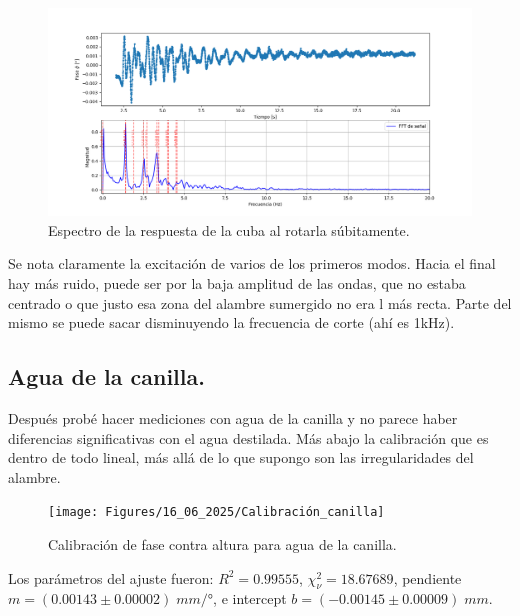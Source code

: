\begin{figure}[th!]
	\centering
	\includegraphics[width=0.87\linewidth]{Figures/16_06_2025/Rotas_caja}
	\caption{Espectro de la respuesta de la cuba al rotarla súbitamente.}
	\label{fig:rotascaja}
\end{figure}

Se nota claramente la excitación de varios de los primeros modos. Hacia el final hay más ruido, puede ser por la baja amplitud de las ondas, que no estaba centrado o que justo esa zona del alambre sumergido no era l más recta. Parte del mismo se puede sacar disminuyendo la frecuencia de corte (ahí es 1kHz). 


\subsection*{Agua de la canilla.}
Después probé hacer mediciones con agua de la canilla y no parece haber diferencias significativas con el agua destilada. Más abajo la calibración que es dentro de todo lineal, más allá de lo que supongo son las irregularidades del alambre.

\begin{figure}[th!]
	\centering
	\texttt{[image: Figures/16\_06\_2025/Calibración\_canilla]}
	\caption{Calibración de fase contra altura para agua de la canilla.}
	\label{fig:calibracioncanilla}
\end{figure}

Los parámetros del ajuste fueron: $R^2=0.99555$,	$\chi_\nu^2=18.67689$,	pendiente $m = (0.00143 \pm 0.00002)\; mm/°$,	e intercept $b = (-0.00145 \pm 0.00009)\; mm$. 

